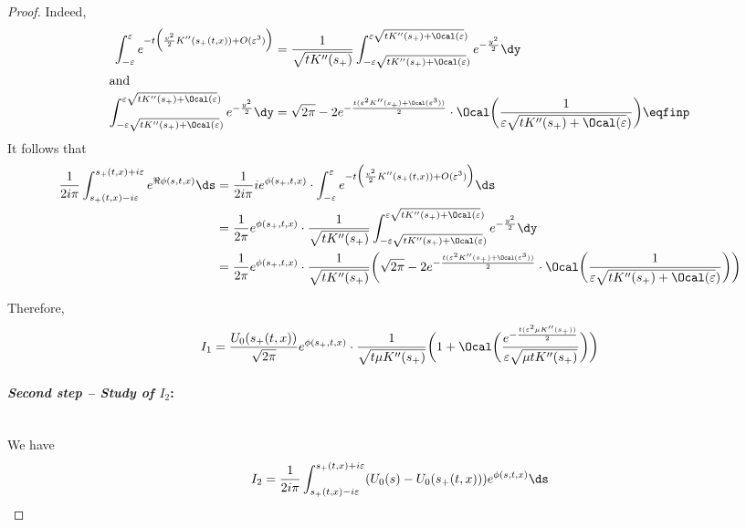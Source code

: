 \begin{proof}
Indeed, 
\begin{align*}
    \int_{- \varepsilon}^{\varepsilon} e^{- t \Big(\frac{v^2}{2} K''(s_+(t,x)) + O(\varepsilon^3)\Big)} 
    &= 
     \frac{1}{\sqrt{tK''(s_+)}} \int_{- \varepsilon \sqrt{tK''(s_+) + \Ocal(\varepsilon})}^{\varepsilon \sqrt{tK''(s_+) + \Ocal(\varepsilon})} e^{- \frac{y^2}{2}}\dy \\
     \intertext{and}
     \int_{- \varepsilon \sqrt{tK''(s_+) + \Ocal(\varepsilon})}^{\varepsilon \sqrt{tK''(s_+) + \Ocal(\varepsilon})} e^{- \frac{y^2}{2}}\dy &= 
    \sqrt{2\pi} - 2 e^{-\frac{t(\varepsilon^2 K''(s_+) + \Ocal(\varepsilon^3))}{2}} \cdot \Ocal\bigg(\frac{1 }{\varepsilon \sqrt{tK''(s_+) + \Ocal(\varepsilon})}\bigg)
    \eqfinp
\end{align*}
It follows that 
    \begin{align*}
     \frac{1}{2i\pi}   \int_{s_+(t,x) - i\varepsilon}^{s_+(t,x) + i\varepsilon} e^{\Re \phi(s,t,x)} \ds 
     &= 
     \frac{1}{2i\pi} i e^{\phi(s_+, t, x)} \cdot \int_{- \varepsilon}^{\varepsilon} e^{- t \Big(\frac{v^2}{2} K''(s_+(t,x)) + O(\varepsilon^3)\Big)} \ds  \\
     &= 
      \frac{1}{2\pi} e^{\phi(s_+, t, x)} \cdot \frac{1}{\sqrt{tK''(s_+)}} \int_{- \varepsilon \sqrt{tK''(s_+) + \Ocal(\varepsilon})}^{\varepsilon \sqrt{tK''(s_+) + \Ocal(\varepsilon})} e^{- \frac{y^2}{2}}\dy \\
     &=
    \frac{1}{2\pi} e^{\phi(s_+, t, x)} \cdot \frac{1}{\sqrt{tK''(s_+)}} \bigg( 
    \sqrt{2\pi} - 2 e^{-\frac{t(\varepsilon^2 K''(s_+) + \Ocal(\varepsilon^3))}{2}} \cdot \Ocal\bigg(\frac{1 }{\varepsilon \sqrt{tK''(s_+) + \Ocal(\varepsilon})}\bigg) \bigg) \\
    \end{align*}
    
Therefore, 
    \begin{equation}
    I_1 = \frac{U_0(s_+(t,x))}{\sqrt{2\pi}} e^{\phi(s_+, t, x)} \cdot \frac{1}{\sqrt{t \mu K''(s_+)}} \bigg( 
    1 + \Ocal\bigg(\frac{e^{-\frac{t(\varepsilon^2 \mu K''(s_+))}{2}} }{\varepsilon \sqrt{\mu tK''(s_+)}}\bigg) \bigg)\\
    \end{equation}

\medskip
\paragraph{\textit{Second step -- Study of $I_2$}:}\mbox{}\\
We have 
    \begin{equation*}
        I_2 = \frac{1}{2i \pi} \int_{s_+(t,x) - i\varepsilon}^{s_+(t,x) + i\varepsilon} (U_0(s) -  U_0(s_+(t,x)))  e^{\phi(s,t,x)} \ds 
    \end{equation*}
    

\end{proof}
